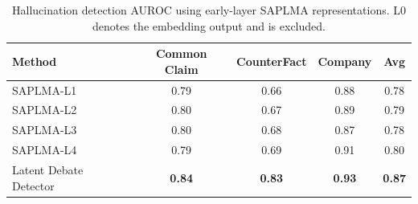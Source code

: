 \begin{table}[t]
    \centering
    \tiny
    \setlength{\tabcolsep}{3mm}
    \begin{tabular}{lcccc}
        \toprule
        \textbf{Method} & \textbf{Common Claim} & \textbf{CounterFact} & \textbf{Company} & \textbf{Avg}\\
        \midrule
        SAPLMA-L1 &0.79&0.66&0.88&0.78\\
        SAPLMA-L2 &0.80&0.67&0.89&0.79\\
        SAPLMA-L3 &0.80&0.68&0.87&0.78\\
        SAPLMA-L4 &0.79&0.69&0.91&0.80\\
        \rowcolor{gray!10}Latent Debate Detector &\textbf{0.84}&\textbf{0.83}&\textbf{0.93}&\textbf{0.87}\\
        \bottomrule
    \end{tabular}
    \caption{Hallucination detection AUROC using early-layer SAPLMA representations. L0 denotes the embedding output and is excluded.}
    \label{tab:early_layer_saplma}
\end{table}

